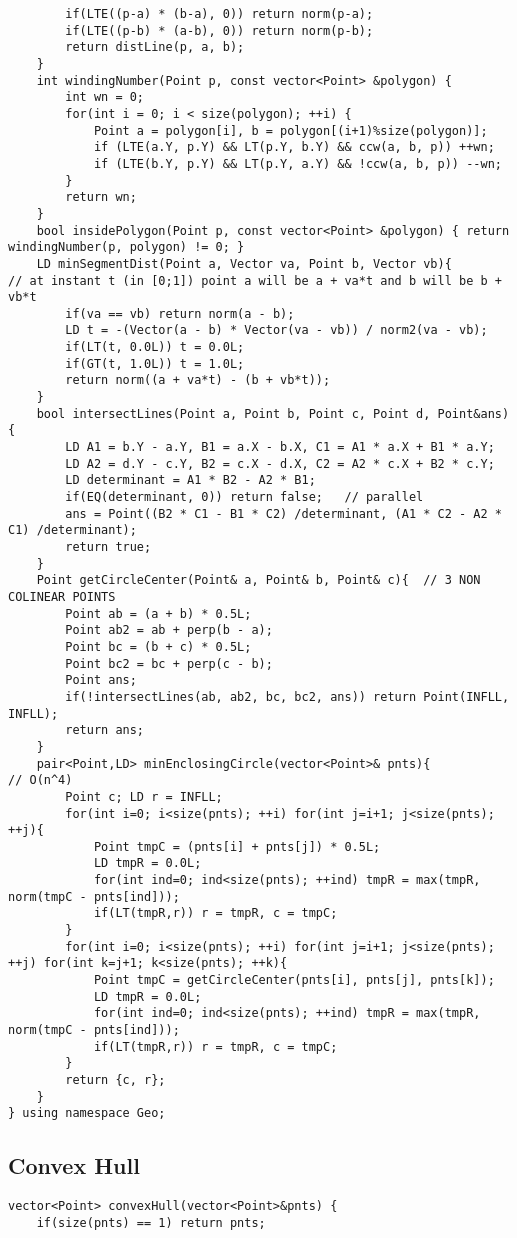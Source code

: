 \documentclass[12pt,a4paper,onesided]{article}
\begin{document}
\begin{multicols}{3}
\begin{lstlisting}
		if(LTE((p-a) * (b-a), 0)) return norm(p-a);
		if(LTE((p-b) * (a-b), 0)) return norm(p-b);
		return distLine(p, a, b);
	}
	int windingNumber(Point p, const vector<Point> &polygon) {
		int wn = 0;
		for(int i = 0; i < size(polygon); ++i) {
			Point a = polygon[i], b = polygon[(i+1)%size(polygon)];
			if (LTE(a.Y, p.Y) && LT(p.Y, b.Y) && ccw(a, b, p)) ++wn;
			if (LTE(b.Y, p.Y) && LT(p.Y, a.Y) && !ccw(a, b, p)) --wn;
		}
		return wn;
	}
	bool insidePolygon(Point p, const vector<Point> &polygon) { return windingNumber(p, polygon) != 0; }
	LD minSegmentDist(Point a, Vector va, Point b, Vector vb){       // at instant t (in [0;1]) point a will be a + va*t and b will be b + vb*t
		if(va == vb) return norm(a - b);
		LD t = -(Vector(a - b) * Vector(va - vb)) / norm2(va - vb);
		if(LT(t, 0.0L)) t = 0.0L;
		if(GT(t, 1.0L)) t = 1.0L;
		return norm((a + va*t) - (b + vb*t));
	}
	bool intersectLines(Point a, Point b, Point c, Point d, Point&ans) {
		LD A1 = b.Y - a.Y, B1 = a.X - b.X, C1 = A1 * a.X + B1 * a.Y;
		LD A2 = d.Y - c.Y, B2 = c.X - d.X, C2 = A2 * c.X + B2 * c.Y;
		LD determinant = A1 * B2 - A2 * B1;
		if(EQ(determinant, 0)) return false;   // parallel
		ans = Point((B2 * C1 - B1 * C2) /determinant, (A1 * C2 - A2 * C1) /determinant);
		return true;
	}
	Point getCircleCenter(Point& a, Point& b, Point& c){  // 3 NON COLINEAR POINTS
		Point ab = (a + b) * 0.5L;
		Point ab2 = ab + perp(b - a);
		Point bc = (b + c) * 0.5L;
		Point bc2 = bc + perp(c - b);
		Point ans;
		if(!intersectLines(ab, ab2, bc, bc2, ans)) return Point(INFLL, INFLL);
		return ans;
	}
	pair<Point,LD> minEnclosingCircle(vector<Point>& pnts){            // O(n^4)
		Point c; LD r = INFLL;
		for(int i=0; i<size(pnts); ++i) for(int j=i+1; j<size(pnts); ++j){
			Point tmpC = (pnts[i] + pnts[j]) * 0.5L;
			LD tmpR = 0.0L;
			for(int ind=0; ind<size(pnts); ++ind) tmpR = max(tmpR, norm(tmpC - pnts[ind]));
			if(LT(tmpR,r)) r = tmpR, c = tmpC;
		}
		for(int i=0; i<size(pnts); ++i) for(int j=i+1; j<size(pnts); ++j) for(int k=j+1; k<size(pnts); ++k){
			Point tmpC = getCircleCenter(pnts[i], pnts[j], pnts[k]);
			LD tmpR = 0.0L;
			for(int ind=0; ind<size(pnts); ++ind) tmpR = max(tmpR, norm(tmpC - pnts[ind]));
			if(LT(tmpR,r)) r = tmpR, c = tmpC;
		}
		return {c, r};
	}
} using namespace Geo;
\end{lstlisting}



\subsection{Convex Hull}
\begin{lstlisting}
vector<Point> convexHull(vector<Point>&pnts) {
    if(size(pnts) == 1) return pnts;


\end{lstlisting}
\end{multicols}
\end{document}

